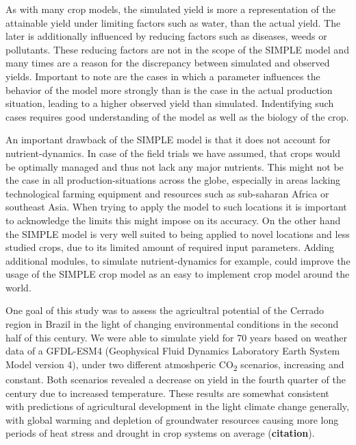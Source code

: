 \documentclass[11pt]{article}
\begin{document}
As with many crop models, the simulated yield is more a representation of the attainable yield under limiting factors such as water, than the actual yield. The later is additionally influenced by reducing factors such as diseases, weeds or pollutants. These reducing factors are not in the scope of the SIMPLE model and many times are a reason for the discrepancy between simulated and observed yields. Important to note are the cases in which a parameter influences the behavior of the model more strongly than is the case in the actual production situation, leading to a higher observed yield than simulated. Indentifying such cases requires good understanding of the model as well as the biology of the crop.

An important drawback of the SIMPLE model is that it does not account for nutrient-dynamics. In case of the field trials we have assumed, that crops would be optimally managed and thus not lack any major nutrients. This might not be the case in all production-situations across the globe, especially in areas lacking technological farming equipment and resources such as sub-saharan Africa or southeast Asia. When trying to apply the model to such locations it is important to acknowledge the limits this might impose on its accuracy. On the other hand the SIMPLE model is very well suited to being applied to novel locations and less studied crops, due to its limited amount of required input parameters. Adding additional modules, to simulate nutrient-dynamics for example, could improve the usage of the SIMPLE crop model as an easy to implement crop model around the world.

One goal of this study was to assess the agricultral potential of the Cerrado region in Brazil in the light of changing environmental conditions in the second half of this century. We were able to simulate yield for 70 years based on weather data of a GFDL-ESM4 (Geophysical Fluid Dynamics Laboratory Earth System Model version 4), under two different atmoshperic CO\textsubscript{2} scenarios, increasing and constant. Both scenarios revealed a decrease on yield in the fourth quarter of the century due to increased temperature. These results are somewhat consistent with predictions of agricultural development in the light climate change generally, with global warming and depletion of groundwater resources causing more long periods of heat stress and drought in crop systems on average (\textbf{citation}).
\end{document}
